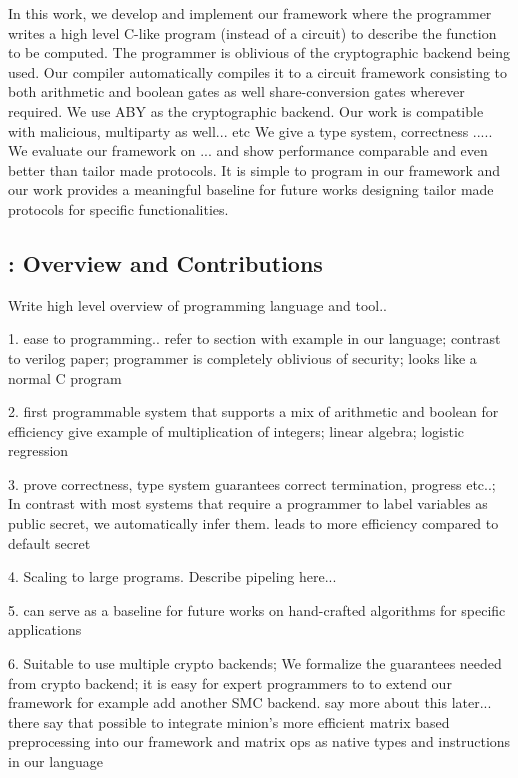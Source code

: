 In this work, we develop and implement our framework \tool where the programmer writes a high level C-like program (instead of a circuit) to describe the function to be computed. The programmer is oblivious of the cryptographic backend being used. Our compiler automatically compiles it to a circuit framework consisting to both arithmetic and boolean gates as well share-conversion gates wherever required. We use ABY as the cryptographic backend.  Our work is compatible with malicious, multiparty as well... etc We give a type system, correctness ..... We evaluate our framework on ... and show performance comparable and even better than tailor made protocols. It is simple to program in our framework and our work provides a meaningful baseline for future works designing tailor made protocols for specific functionalities.

\subsection{\tool: Overview and Contributions} Write high level overview of programming language and tool..

1. ease to programming.. refer to section with example in our language; contrast to verilog paper; programmer is completely oblivious of security; looks like a normal C program

2. first programmable system that supports a mix of arithmetic and boolean for efficiency give example of multiplication of integers; linear algebra; logistic regression

3. prove correctness, type system guarantees correct termination, progress etc..; In contrast with most systems that require a programmer to label variables as public secret, we automatically infer them. leads to more efficiency compared to default secret

4. Scaling to large programs. Describe pipeling here...

5. can serve as a baseline for future works on hand-crafted algorithms for specific applications

6. Suitable to use multiple crypto backends; We formalize the guarantees needed from crypto backend; it is easy for expert programmers to to extend our framework for example add another SMC backend. say more about this later... there say that possible to integrate minion's more efficient matrix based preprocessing into our framework and matrix ops as native types and instructions in our language

